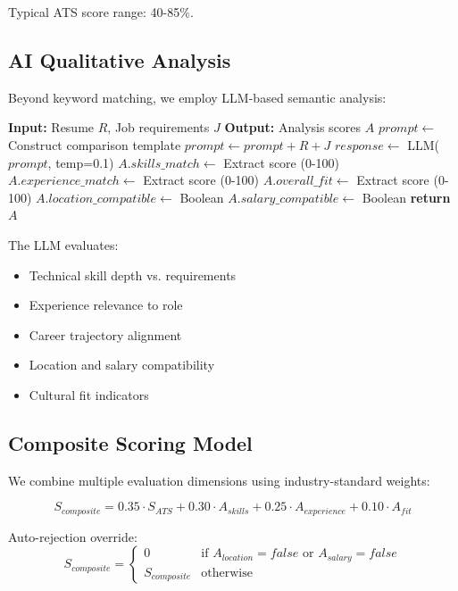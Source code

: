 \documentclass[conference]{IEEEtran}
\begin{document}
Typical ATS score range: 40-85\%.

\subsection{AI Qualitative Analysis}

Beyond keyword matching, we employ LLM-based semantic analysis:

\begin{algorithm}[h]
\caption{AI Resume Analysis}
\label{alg:ai_analysis}
\begin{algorithmic}[1]
\STATE \textbf{Input:} Resume $R$, Job requirements $J$
\STATE \textbf{Output:} Analysis scores $A$
\STATE
\STATE $prompt \leftarrow$ Construct comparison template
\STATE $prompt \leftarrow prompt + R + J$
\STATE $response \leftarrow$ LLM($prompt$, temp=0.1)
\STATE $A.skills\_match \leftarrow$ Extract score (0-100)
\STATE $A.experience\_match \leftarrow$ Extract score (0-100)
\STATE $A.overall\_fit \leftarrow$ Extract score (0-100)
\STATE $A.location\_compatible \leftarrow$ Boolean
\STATE $A.salary\_compatible \leftarrow$ Boolean
\STATE \textbf{return} $A$
\end{algorithmic}
\end{algorithm}

The LLM evaluates:
\begin{itemize}
    \item Technical skill depth vs. requirements
    \item Experience relevance to role
    \item Career trajectory alignment
    \item Location and salary compatibility
    \item Cultural fit indicators
\end{itemize}

\subsection{Composite Scoring Model}

We combine multiple evaluation dimensions using industry-standard weights:

\begin{equation}
S_{composite} = 0.35 \cdot S_{ATS} + 0.30 \cdot A_{skills} + 0.25 \cdot A_{experience} + 0.10 \cdot A_{fit}
\end{equation}

Auto-rejection override:
\begin{equation}
S_{composite} = 
\begin{cases}
0 & \text{if } A_{location} = false \text{ or } A_{salary} = false \\
S_{composite} & \text{otherwise}
\end{cases}
\end{equation}
\end{document}
